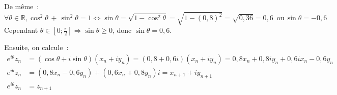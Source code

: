 \documentclass{article}
\begin{document}
 De même~:
 \begin{displaymath}
  \forall\theta\in\mathbb{R}, \cos^2 \theta\,+\,\sin^2 \theta=1 \Leftrightarrow\sin\theta = \sqrt{1 - \cos^2 \theta} = \sqrt{1 - (0,8)^2} = \sqrt{0,36} = 0,6 \,\,\,\mathrm{ou}\,\sin\theta = -0,6
 \end{displaymath}
Cependant $\theta \in\left[0;\frac{\pi}{2}\right] \Rightarrow\sin\theta\geqslant0$, donc $\sin\theta = 0,6$.

Ensuite, on calcule~:
\begin{align*}
 e^{i\theta}z_n &= (\cos\theta + i\sin\theta)(x_n +iy_n) = (0,8 + 0,6i)(x_n+ iy_n)=0,8x_n + 0,8iy_n + 0,6ix_n - 0,6y_n \\
 e^{i\theta}z_n &= (0,8x_n - 0,6y_n) + (0,6x_n + 0,8y_n)i = x_{n+1} + iy_{n+1}\\
 e^{i\theta}z_n &= z_{n+1}
\end{align*}
\end{document}
